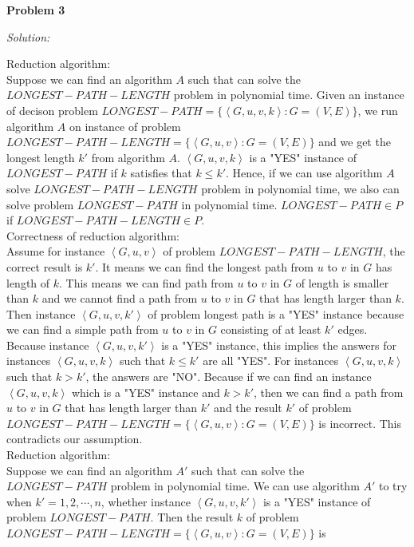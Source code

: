 \documentclass[12pt,letterpaper]{article}
\def\pp{\par\noindent}
\newcommand{\problem}[1]{ \bigskip \pp \textbf{Problem #1}\par}
\newcommand{\solution}{\textit{Solution:}\par}
\begin{document}
\problem{3}
\solution
Reduction algorithm: \\
Suppose we can find an algorithm $A$ such that can solve the $LONGEST-PATH-LENGTH$ problem in polynomial time.
Given an instance of decison problem $LONGEST-PATH = \{ \left \langle G,u,v,k \right \rangle : G = (V,E) \}$,
we run algorithm $A$ on instance of problem $LONGEST-PATH-LENGTH = \{ \left \langle G,u,v \right \rangle : G = (V,E) \} $
and we get the longest length $k'$ from algorithm $A$. $ \left \langle G,u,v,k \right \rangle $ is a "YES" instance of $LONGEST-PATH$
if $k$ satisfies that $k \le k'$. Hence, if we can use algorithm $A$ solve $LONGEST-PATH-LENGTH$ problem in polynomial time, we also can
solve problem $LONGEST-PATH$ in polynomial time. $LONGEST-PATH \in P$ if $LONGEST-PATH-LENGTH \in P$. \\
Correctness of reduction algorithm: \\
Assume for instance $\left \langle G,u,v \right \rangle$ of problem $LONGEST-PATH-LENGTH$, the correct result is $k'$. It means we can find
the longest path from $u$ to $v$ in $G$ has length of $k$. This means we can find path from $u$ to $v$ in $G$ of length is smaller than $k$ and we cannot
find a path from $u$ to $v$ in $G$ that has length larger than $k$. Then instance $\left \langle G,u,v,k' \right \rangle$ of problem longest path is
a "YES" instance because we can find a simple path from $u$ to $v$ in $G$ consisting of at least $k'$ edges. Because instance $\left \langle G,u,v,k' \right \rangle$ is
a "YES" instance, this implies the answers for instances $\left \langle G,u,v,k \right \rangle$ such that $k \le k'$ are all "YES". For instances $\left \langle G,u,v,k \right \rangle$
such that $k > k'$, the answers are "NO". Because if we can find an instance $\left \langle G,u,v,k \right \rangle$ which is a "YES" instance and $k>k'$, then we can find
a path from $u$ to $v$ in $G$ that has length larger than $k'$ and the result $k'$ of problem $LONGEST-PATH-LENGTH = \{ \left \langle G,u,v \right \rangle : G = (V,E) \} $ is
incorrect. This contradicts our assumption. \\
Reduction algorithm: \\
Suppose we can find an algorithm $A'$ such that can solve the $LONGEST-PATH$ problem in polynomial time.
We can use algorithm $A'$ to try when $k' = 1,2,\cdots,n$, whether instance $ \left \langle G,u,v,k' \right \rangle $ is a "YES" instance of problem
$LONGEST-PATH$. Then the result $k$ of problem $LONGEST-PATH-LENGTH = \{ \left \langle G,u,v \right \rangle : G = (V,E) \} $ is
\end{document}
